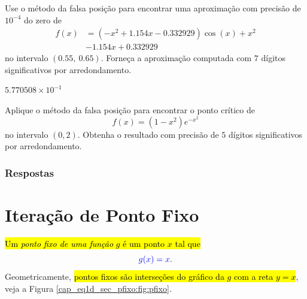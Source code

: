 \begin{exer}
  Use o método da falsa posição para encontrar uma aproximação com precisão de $10^{-4}$ do zero de
  \begin{equation}
    \begin{aligned}
      f(x) &= (-x^2+1.154x-0.332929)\cos(x) + x^2 \\
           &- 1.154x + 0.332929
    \end{aligned}
\end{equation}
no intervalo $(0.55, ~0.65)$. Forneça a aproximação computada com $7$ dígitos significativos por arredondamento.
\end{exer}
\begin{resp}
  $5.770508\times 10^{-1}$
\end{resp}

\begin{exer}
  Aplique o método da falsa posição para encontrar o ponto crítico de
  \begin{equation}
    f(x) = (1-x^2)e^{-x^2}
  \end{equation}
  no intervalo $(0, 2)$. Obtenha o resultado com precisão de $5$ dígitos significativos por arredondamento.
\end{exer}

\ifisbook
\subsubsection{Respostas}
\shipoutAnswer
\fi


\section{Iteração de Ponto Fixo}\label{cap_eq1d_sec_pfixo}

\hl{Um \emph{ponto fixo de uma função} $g$ é um ponto $x$ tal que}
\begin{equation}\color{blue}g(x) = x.
\end{equation}
Geometricamente, \hl{pontos fixos são interseções do gráfico da $g$ com a reta $y=x$}, veja a Figura \ref{cap_eq1d_sec_pfixo:fig:pfixo}.

